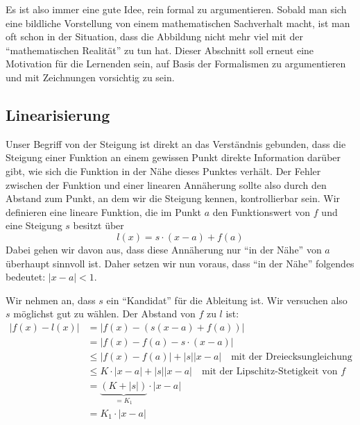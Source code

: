 Es ist also immer eine gute Idee, rein formal zu argumentieren. Sobald man sich eine bildliche Vorstellung von einem mathematischen Sachverhalt macht, ist man oft schon in der Situation, dass die Abbildung nicht mehr viel mit der "`mathematischen Realität"' zu tun hat. Dieser Abschnitt soll erneut eine Motivation für die Lernenden sein, auf Basis der Formalismen zu argumentieren und mit Zeichnungen vorsichtig zu sein.

\subsection{Linearisierung}

Unser Begriff von der Steigung ist direkt an das Verständnis gebunden, dass die Steigung einer Funktion an einem gewissen Punkt direkte Information darüber gibt, wie sich die Funktion in der Nähe dieses Punktes verhält. Der Fehler zwischen der Funktion und einer linearen Annäherung sollte also durch den Abstand zum Punkt, an dem wir die Steigung kennen, kontrollierbar sein. Wir definieren eine lineare Funktion, die im Punkt $a$ den Funktionswert von $f$  und eine Steigung $s$ besitzt über
\[
l(x) = s\cdot (x-a)+f(a)
\]
Dabei gehen wir davon aus, dass diese Annäherung nur "`in der Nähe"' von $a$ überhaupt sinnvoll ist. Daher setzen wir nun voraus, dass "`in der Nähe"' folgendes bedeutet: $|x-a|<1$.

Wir nehmen an, dass $s$ ein "`Kandidat"' für die Ableitung ist. Wir versuchen also $s$ möglichst gut zu wählen. 
Der Abstand von $f$ zu $l$ ist:
\begin{equation}\label{eq:lin}
\begin{split}
|f(x)-l(x)| &= |f(x)-(s(x-a)+f(a))| \\
&= |f(x)-f(a) -s\cdot (x-a)| \\
&\le |f(x)-f(a)| + |s||x-a| \quad \text{mit der Dreiecksungleichung} \\
&\le K\cdot |x-a| + |s||x-a| \quad \text{mit der Lipschitz-Stetigkeit von }f \\
&= \underbrace{(K+|s|)}_{=K_1}\cdot |x-a| \\
&= K_1\cdot |x-a|
\end{split}
\end{equation}

